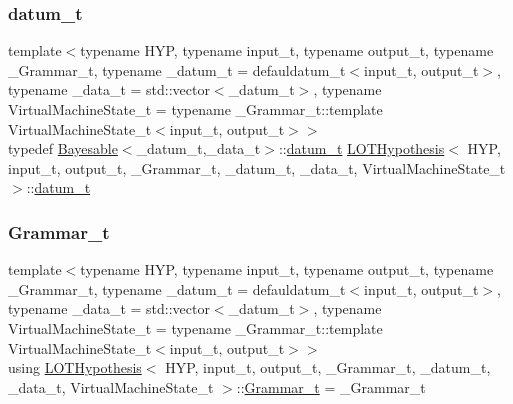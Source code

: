 \mbox{\label{class_l_o_t_hypothesis_ae36b1f113f45ee5ac82660028672739b}} 
\subsubsection{\texorpdfstring{datum\+\_\+t}{datum\_t}}
{\footnotesize\ttfamily template$<$typename H\+YP, typename input\+\_\+t, typename output\+\_\+t, typename \+\_\+\+Grammar\+\_\+t, typename \+\_\+datum\+\_\+t = defauldatum\+\_\+t$<$input\+\_\+t, output\+\_\+t$>$, typename \+\_\+data\+\_\+t = std\+::vector$<$\+\_\+datum\+\_\+t$>$, typename Virtual\+Machine\+State\+\_\+t = typename \+\_\+\+Grammar\+\_\+t\+::template Virtual\+Machine\+State\+\_\+t$<$input\+\_\+t, output\+\_\+t$>$$>$ \\
typedef \hyperlink{class_bayesable}{Bayesable}$<$\+\_\+datum\+\_\+t,\+\_\+data\+\_\+t$>$\+::\hyperlink{class_l_o_t_hypothesis_ae36b1f113f45ee5ac82660028672739b}{datum\+\_\+t} \hyperlink{class_l_o_t_hypothesis}{L\+O\+T\+Hypothesis}$<$ H\+YP, input\+\_\+t, output\+\_\+t, \+\_\+\+Grammar\+\_\+t, \+\_\+datum\+\_\+t, \+\_\+data\+\_\+t, Virtual\+Machine\+State\+\_\+t $>$\+::\hyperlink{class_l_o_t_hypothesis_ae36b1f113f45ee5ac82660028672739b}{datum\+\_\+t}}

\mbox{\label{class_l_o_t_hypothesis_a8006204013d471860e54c49d19edbace}} 
\subsubsection{\texorpdfstring{Grammar\+\_\+t}{Grammar\_t}}
{\footnotesize\ttfamily template$<$typename H\+YP, typename input\+\_\+t, typename output\+\_\+t, typename \+\_\+\+Grammar\+\_\+t, typename \+\_\+datum\+\_\+t = defauldatum\+\_\+t$<$input\+\_\+t, output\+\_\+t$>$, typename \+\_\+data\+\_\+t = std\+::vector$<$\+\_\+datum\+\_\+t$>$, typename Virtual\+Machine\+State\+\_\+t = typename \+\_\+\+Grammar\+\_\+t\+::template Virtual\+Machine\+State\+\_\+t$<$input\+\_\+t, output\+\_\+t$>$$>$ \\
using \hyperlink{class_l_o_t_hypothesis}{L\+O\+T\+Hypothesis}$<$ H\+YP, input\+\_\+t, output\+\_\+t, \+\_\+\+Grammar\+\_\+t, \+\_\+datum\+\_\+t, \+\_\+data\+\_\+t, Virtual\+Machine\+State\+\_\+t $>$\+::\hyperlink{class_l_o_t_hypothesis_a8006204013d471860e54c49d19edbace}{Grammar\+\_\+t} =  \+\_\+\+Grammar\+\_\+t}



